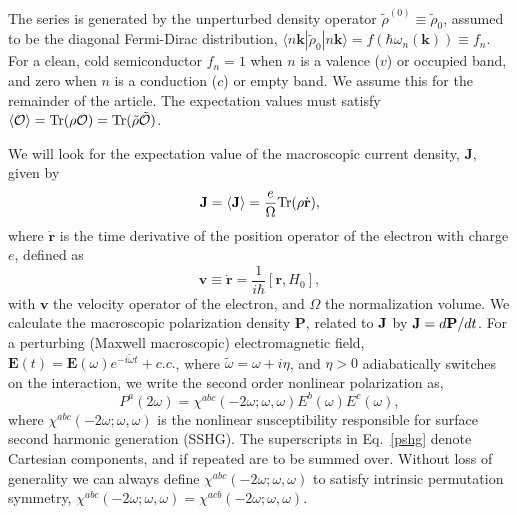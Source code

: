 \documentclass[floatfix,prb,aps,superscriptaddress,11pt,preprint,letterpaper]{revtex4}
\begin{document}
The series is generated by the unperturbed density operator $\tilde{\rho}
^{(0)}\equiv \tilde{\rho}_{0}$, assumed to be the diagonal Fermi-Dirac distribution, 
$\langle n\mathbf{k}|\tilde{\rho}_{0}|n\mathbf{k}\rangle=f(\hbar \omega_{n}(\mathbf{k}))\equiv f_{n}$. For a
clean, cold semiconductor $f_{n}=1$ {\color{red} when} $n$ {\color{red} is} a valence ($v$) or
occupied band, and zero {\color{red} when} $n$ {\color{red} is} a conduction ($c$) or empty band.
{\color{red} We assume this for the remainder of the article.}
{\color{red} T}he expectation values must satisfy
$
\langle{\cal O}\rangle=
\mbox{Tr}({\rho}{\cal O})
=
\mbox{Tr}(\tilde{{\rho}}\tilde{\cal O})
$.  

We will look for the expectation value of the macroscopic current density, 
$\mathbf{J}$, given by 
\begin{equation}
\mathbf{J}=\langle{\mathbf{J}}\rangle=\frac{e}{\Omega}\mbox{Tr}({\rho}\dot{\mathbf{r}})
,
\label{pe}
\end{equation}
where $\dot{\mathbf{r}}$ is the time derivative of the position operator of the
electron {\color{red} with} charge $e$, {\color{red} defined as}
\begin{equation}
\mathbf{v}\equiv \dot{\mathbf{r}}=\frac{1}{i\hbar }[\mathbf{r},H_0],  
\label{mv}
\end{equation}
with $\mathbf{v}$ the velocity operator of the electron, and $\Omega$ the
normalization volume. We calculate the macroscopic polarization density 
$\mathbf{P}$, related to $\mathbf{J}$ by
$\mathbf{J}=d\mathbf{P}/dt$. For a 
perturbing (Maxwell macroscopic) electromagnetic field, $\mathbf{E}(t)=
\mathbf{E}(\omega )e^{-i\tilde{\omega} t}+c.c.$,
where $\tilde\omega=\omega+i\eta $,
and $\eta >0$ {\color{red} adiabatically switches on} the interaction,
we write the second order nonlinear
polarization as, 
\begin{equation}
P^a(2\omega)=\chi ^{abc}(-2\omega;\omega,\omega)E^{b}(\omega)E^{c}(\omega),  
\label{pshg}
\end{equation}
where $\chi^{abc}(-2\omega ;\omega ,\omega )$ is the nonlinear
susceptibility responsible {\color{red} for} surface second harmonic generation
(SSHG). 
The 
superscripts in Eq.~\eqref{pshg} denote Cartesian components, and if
repeated are to be summed over. Without loss of generality we can always
define $\chi^{abc}(-2\omega;\omega,\omega)$
 to satisfy intrinsic permutation
symmetry, 
$\chi^{abc}(-2\omega ;\omega ,\omega )=\chi ^{acb}(-2\omega ;\omega
,\omega )$.
\end{document}
